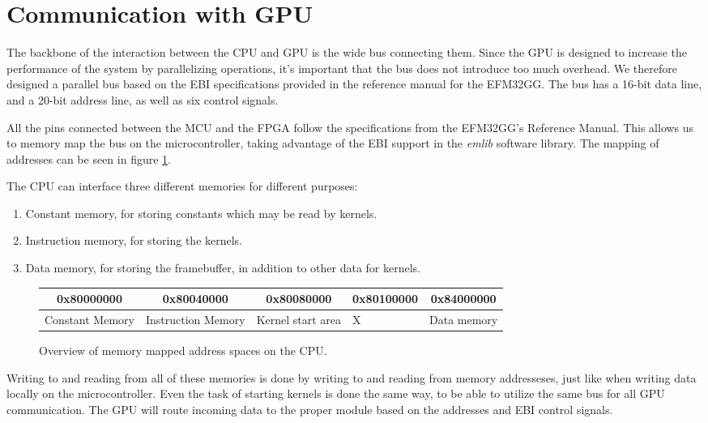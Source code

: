 \documentclass[../main/report.tex]{subfiles}
\begin{document}
\section{Communication with GPU}

The backbone of the interaction between the CPU and GPU is the wide bus connecting them.
Since the GPU is designed to increase the performance of the system by parallelizing operations,
it's important that the bus does not introduce too much overhead.
We therefore designed a parallel bus based on the EBI specifications provided
in the reference manual for the EFM32GG\cite[p.175]{efm32gg}.
The bus has a 16-bit data line, and a 20-bit address line, as well as six control signals.

All the pins connected between the MCU and the FPGA follow the specifications from the EFM32GG's Reference Manual\cite[p.175]{efm32gg}.
This allows us to memory map the bus on the microcontroller, taking advantage of the EBI support in the \emph{emlib} software library\cite{emlib}.
The mapping of addresses can be seen in figure \ref{fig:memory_map}.

The CPU can interface three different memories for different purposes:

\begin{enumerate}
    \item Constant memory, for storing constants which may be read by kernels.
    \item Instruction memory, for storing the kernels.
    \item Data memory, for storing the framebuffer, in addition to other data for kernels.
\end{enumerate}

\begin{figure}[H]
    \centering
    \begin{tabularx}{\textwidth}{|X|X|X|X|X|}
    \multicolumn{1}{c}{0x80000000} & \multicolumn{1}{c}{0x80040000} & \multicolumn{1}{c}{0x80080000} & \multicolumn{1}{c}{0x80100000} & \multicolumn{1}{c}{0x84000000} \\ \hline
    Constant Memory & Instruction Memory & Kernel start area & X & Data memory \\ \hline
    \end{tabularx}
    \caption{Overview of memory mapped address spaces on the CPU.}
    \label{fig:memory_map}
\end{figure}

Writing to and reading from all of these memories is done by writing to and reading from memory addresseses,
just like when writing data locally on the microcontroller.
Even the task of starting kernels is done the same way, to be able to utilize the same bus for all GPU communication.
The GPU will route incoming data to the proper module based on the addresses and EBI control signals.
\end{document}
